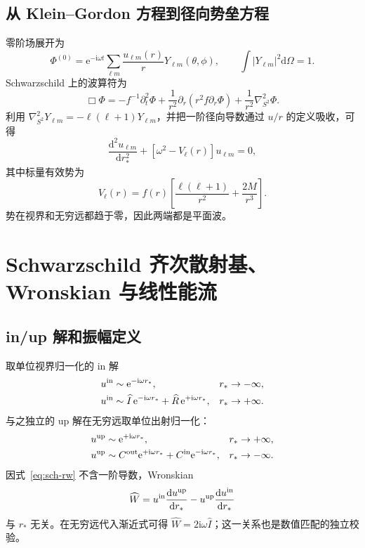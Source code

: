 \documentclass[UTF8,fontset=fandol,11pt,a4paper,oneside]{ctexart}
\numberwithin{equation}{section}
\newcommand{\dd}{\mathrm d}
\newcommand{\ii}{\mathrm i}
\newcommand{\ee}{\mathrm e}
\newcommand{\abs}[1]{\left|#1\right|}
\begin{document}
\subsection{从 Klein--Gordon 方程到径向势垒方程}

零阶场展开为
\begin{equation}
\Phi^{(0)}=\ee^{-\ii\omega t}
\sum_{\ell m}\frac{u_{\ell m}(r)}{r}Y_{\ell m}(\theta,\phi),
\qquad \int\abs{Y_{\ell m}}^2\dd\Omega=1.
\end{equation}
Schwarzschild 上的波算符为
\begin{equation}
\Box\Phi=-f^{-1}\partial_t^2\Phi
+\frac{1}{r^2}\partial_r(r^2f\partial_r\Phi)
+\frac{1}{r^2}\nabla_{S^2}^2\Phi.
\end{equation}
利用 $\nabla_{S^2}^2Y_{\ell m}=-\ell(\ell+1)Y_{\ell m}$，并把一阶径向导数通过 $u/r$ 的定义吸收，可得
\begin{equation}
\boxed{
\frac{\dd^2u_{\ell m}}{\dd r_*^2}
+\left[\omega^2-V_\ell(r)\right]u_{\ell m}=0,}
\label{eq:sch-rw}
\end{equation}
其中标量有效势为
\begin{equation}
V_\ell(r)=f(r)\left[
\frac{\ell(\ell+1)}{r^2}+\frac{2M}{r^3}
\right].
\label{eq:sch-pot}
\end{equation}
势在视界和无穷远都趋于零，因此两端都是平面波。

\section{Schwarzschild 齐次散射基、Wronskian 与线性能流}
\label{sec:sch-hom}

\subsection{in/up 解和振幅定义}

取单位视界归一化的 in 解
\begin{align}
u^{\rm in}&\sim \ee^{-\ii\omega r_*},&&r_*\to-\infty,\label{eq:sch-in-h}\\
u^{\rm in}&\sim \widehat I\,\ee^{-\ii\omega r_*}
+\widehat R\,\ee^{+\ii\omega r_*},&&r_*\to+\infty.
\label{eq:sch-in-inf}
\end{align}
与之独立的 up 解在无穷远取单位出射归一化：
\begin{align}
u^{\rm up}&\sim \ee^{+\ii\omega r_*},&&r_*\to+\infty,\\
u^{\rm up}&\sim C^{\rm out}\ee^{+\ii\omega r_*}
+C^{\rm in}\ee^{-\ii\omega r_*},&&r_*\to-\infty.
\end{align}
因式~\eqref{eq:sch-rw} 不含一阶导数，Wronskian
\begin{equation}
\widehat W=u^{\rm in}\frac{\dd u^{\rm up}}{\dd r_*}
-u^{\rm up}\frac{\dd u^{\rm in}}{\dd r_*}
\label{eq:sch-W}
\end{equation}
与 $r_*$ 无关。在无穷远代入渐近式可得 $\widehat W=2\ii\omega\widehat I$；这一关系也是数值匹配的独立校验。
\end{document}
